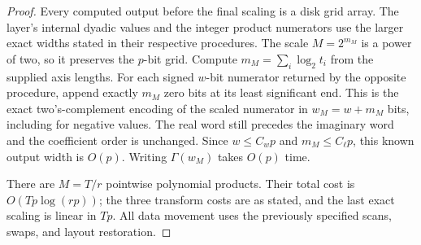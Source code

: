 \begin{proof}
Every computed output before the final scaling is a disk grid array.
The layer's internal dyadic values and the integer product numerators
use the larger exact widths stated in their respective procedures.
The scale $M=2^{m_M}$ is a power of two, so it preserves the $p$-bit
grid. Compute $m_M=\sum_i\log_2t_i$ from the supplied axis lengths.
For each signed $w$-bit numerator returned by the opposite procedure,
append exactly $m_M$ zero bits at its least significant end. This is
the exact two's-complement encoding of the scaled numerator in
$w_M=w+m_M$ bits, including for negative values. The real word still
precedes the imaginary word and the coefficient order is unchanged.
Since $w\leq C_wp$ and $m_M\leq C_\ell p$, this known output width is
$O(p)$. Writing $\Gamma(w_M)$ takes $O(p)$ time.

There are $M=T/r$ pointwise polynomial products.  Their total cost
is $O(Tp\log(rp))$; the three transform costs are as stated, and
the last exact scaling is linear in $Tp$.  All data movement uses
the previously specified scans, swaps, and layout restoration.
\end{proof}
